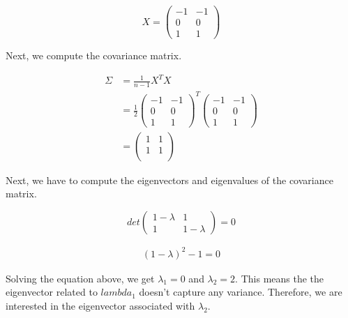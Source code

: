\documentclass{article}
\begin{document}
\[ X = 
    \begin{pmatrix}
        -1 & -1 \\
        0 & 0 \\
        1 & 1
    \end{pmatrix}
\]

Next, we compute the covariance matrix.

\begin{equation}
    \begin{aligned}
        \Sigma &= \frac{1}{n - 1} X^TX \\
               &= \frac{1}{2} 
                \begin{pmatrix}
                    -1 & -1 \\
                    0 & 0 \\
                    1 & 1
                \end{pmatrix}^T
                \begin{pmatrix}
                    -1 & -1 \\
                    0 & 0 \\
                    1 & 1
                \end{pmatrix} \\
                & = \begin{pmatrix}
                    1 & 1 \\
                    1 & 1 \\
                \end{pmatrix}   
    \end{aligned}
\end{equation}

Next, we have to compute the eigenvectors and eigenvalues of the covariance matrix.

\[
    det\begin{pmatrix}
        1 -  \lambda & 1 \\
        1 & 1 - \lambda
    \end{pmatrix}
    = 0
\]

\begin{equation}
    \begin{aligned}
        (1 -  \lambda)^2 - 1 = 0
    \end{aligned}
\end{equation}

Solving the equation above, we get $\lambda_1 = 0$ and $\lambda_2= 2$. This means the the eigenvector related to $lambda_1$ doesn't capture any variance. Therefore, we are interested in the eigenvector associated with $\lambda_2$.
\end{document}
